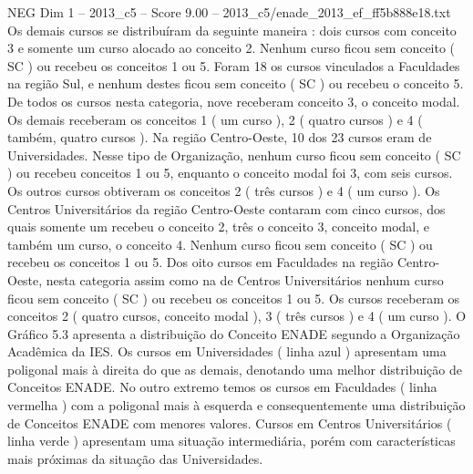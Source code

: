 \begin{textsample}{NEG Dim 1 – 2013\_c5 – Score 9.00 – 2013\_c5/enade\_2013\_ef\_ff5b888e18.txt}
Os demais cursos se distribuíram da seguinte maneira : dois cursos com conceito 3 e somente um curso alocado ao conceito 2.
Nenhum curso ficou sem conceito ( SC ) ou recebeu os conceitos 1 ou 5.
Foram 18 os cursos vinculados a Faculdades na região Sul, e nenhum destes ficou sem conceito ( SC ) ou recebeu o conceito 5.
De todos os cursos nesta categoria, nove receberam conceito 3, o conceito modal.
Os demais receberam os conceitos 1 ( um curso ), 2 ( quatro cursos ) e 4 ( também, quatro cursos ).
Na região Centro-Oeste, 10 dos 23 cursos eram de Universidades.
Nesse tipo de Organização, nenhum curso ficou sem conceito ( SC ) ou recebeu conceitos 1 ou 5, enquanto o conceito modal foi 3, com seis cursos.
Os outros cursos obtiveram os conceitos 2 ( três cursos ) e 4 ( um curso ).
Os Centros Universitários da região Centro-Oeste contaram com cinco cursos, dos quais somente um recebeu o conceito 2, três o conceito 3, conceito modal, e também um curso, o conceito 4.
Nenhum curso ficou sem conceito ( SC ) ou recebeu os conceitos 1 ou 5.
Dos oito cursos em Faculdades na região Centro-Oeste, nesta categoria assim como na de Centros Universitários nenhum curso ficou sem conceito ( SC ) ou recebeu os conceitos 1 ou 5.
Os cursos receberam os conceitos 2 ( quatro cursos, conceito modal ), 3 ( três cursos ) e 4 ( um curso ).
O Gráfico 5.3 apresenta a distribuição do Conceito ENADE segundo a Organização Acadêmica da IES.
Os cursos em Universidades ( linha azul ) apresentam uma poligonal mais à direita do que as demais, denotando uma melhor distribuição de Conceitos ENADE.
No outro extremo temos os cursos em Faculdades ( linha vermelha ) com a poligonal mais à esquerda e consequentemente uma distribuição de Conceitos ENADE com menores valores.
Cursos em Centros Universitários ( linha verde ) apresentam uma situação intermediária, porém com características mais próximas da situação das Universidades.

\end{textsample}
